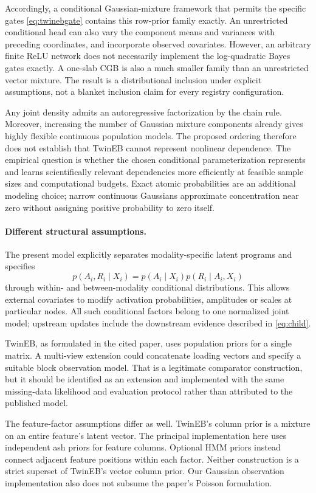 Accordingly, a conditional Gaussian-mixture framework that permits the
specific gates \eqref{eq:twinebgate} contains this row-prior family exactly.
An unrestricted conditional head can also vary the component means and
variances with preceding coordinates, and incorporate observed covariates.
However, an arbitrary finite ReLU network does not necessarily implement
the log-quadratic Bayes gates exactly. A one-slab CGB is also a much
smaller family than an unrestricted vector mixture.
The result is a distributional inclusion under explicit assumptions,
not a blanket inclusion claim for every registry configuration.

Any joint density admits an autoregressive factorization by the chain
rule. Moreover, increasing the number of Gaussian mixture components
already gives highly flexible continuous population models.
The proposed ordering therefore does not establish that TwinEB cannot
represent nonlinear dependence. The empirical question is whether the
chosen conditional parameterization represents and learns scientifically
relevant dependencies more efficiently at feasible sample sizes and
computational budgets. Exact atomic probabilities are an additional
modeling choice; narrow continuous Gaussians approximate concentration
near zero without assigning positive probability to zero itself.

\paragraph{Different structural assumptions.}
The present model explicitly separates modality-specific latent programs
and specifies
\[
p(A_i,R_i\mid X_i)=p(A_i\mid X_i)p(R_i\mid A_i,X_i)
\]
through within- and between-modality conditional distributions.
This allows external covariates to modify activation probabilities,
amplitudes or scales at particular nodes. All such conditional factors
belong to one normalized joint model; upstream updates include the
downstream evidence described in \eqref{eq:child}.

TwinEB, as formulated in the cited paper, uses population priors for a
single matrix. A multi-view extension could concatenate loading vectors
and specify a suitable block observation model. That is a legitimate
comparator construction, but it should be identified as an extension
and implemented with the same missing-data likelihood and evaluation
protocol rather than attributed to the published model.

The feature-factor assumptions differ as well. TwinEB's column prior is a
mixture on an entire feature's latent vector. The principal implementation here
uses independent ash priors for feature columns. Optional HMM priors instead
connect adjacent feature positions within each factor. Neither construction
is a strict superset of TwinEB's vector column prior. Our Gaussian observation
implementation also does not subsume the paper's Poisson formulation.

